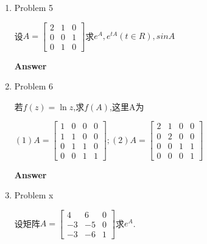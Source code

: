 \documentclass[11pt,letterpaper]{ctexart}
\begin{document}
\begin{enumerate}

\item Problem 5%

设$A = \begin{bmatrix}
	2 & 1 & 0 \\
	0 & 0 & 1 \\
	0 & 1 & 0
\end{bmatrix}$求$e^A, e^{tA}(t \in R), sinA$

\bigskip
\textbf{\large{Answer}}

	



\item Problem 6%

若$f(z) = \ln{z}$,求$f(A)$,这里A为

$(1) A = \begin{bmatrix}
	1 & 0 & 0 & 0 \\
	1 & 1 & 0 & 0 \\
	0 & 1 & 1 & 0 \\
	0 & 0 & 1 & 1
\end{bmatrix}; (2) A = \begin{bmatrix}
	2 & 1 & 0 & 0 \\
	0 & 2 & 0 & 0 \\
	0 & 0 & 1 & 1 \\
	0 & 0 & 0 & 1
\end{bmatrix}$

\bigskip
\textbf{\large{Answer}}



\item Problem x%

设矩阵$A = \begin{bmatrix}
	4 & 6 & 0 \\
	-3 & -5 & 0 \\
	-3 & -6 & 1
\end{bmatrix}$求$e^A$.




\end{enumerate}
\end{document}
